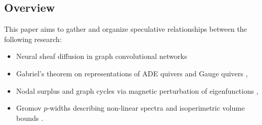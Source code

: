 \documentclass{article}
\theoremstyle{definition}
\begin{document}
\subsection{Overview}
This paper aims to gather and organize speculative relationships between the following research: 
\renewcommand\labelitemi{\tiny$\bullet$}
\begin{itemize}
    \item Neural sheaf diffusion in graph convolutional networks  \cite{https://doi.org/10.48550/arxiv.2202.04579}
    \item Gabriel's theorem on representations of ADE quivers and Gauge quivers \cite{nlab:quiver},
    \item Nodal surplus and graph cycles via magnetic perturbation of eigenfunctions \cite{Berkolaiko_2013},
    \item Gromov $p$-widths describing non-linear spectra and isoperimetric volume bounds  \cite{10.1007/BFb0081739}.
\end{itemize}

\end{document}
